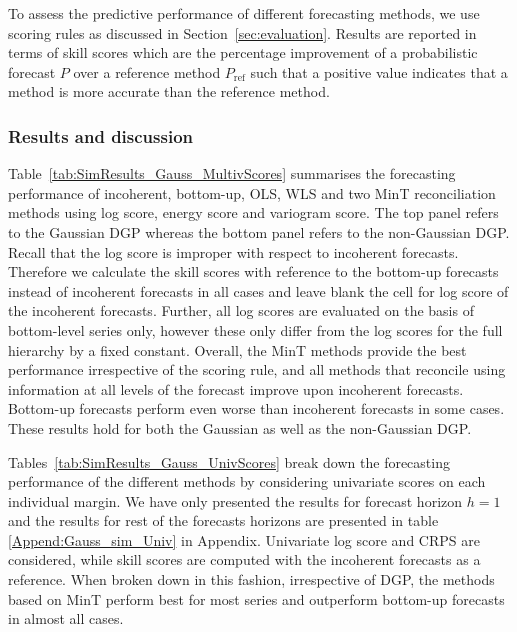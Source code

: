 \documentclass[12pt]{article}
\theoremstyle{definition}
\begin{document}
To assess the predictive performance of different forecasting methods, we use scoring rules as discussed in Section~\ref{sec:evaluation}. Results are reported in terms of skill scores which are the percentage improvement of a probabilistic forecast $P$ over a reference method $P_{\mbox{ref}}$ such that a positive value indicates that a method is more accurate than the reference method.

\subsubsection{Results and discussion}

Table~\ref{tab:SimResults_Gauss_MultivScores} summarises the forecasting performance of incoherent, bottom-up, OLS, WLS and two MinT reconciliation methods using log score, energy score and variogram score. The top panel refers to the Gaussian DGP whereas the bottom panel refers to the non-Gaussian DGP. Recall that the log score is improper with respect to incoherent forecasts. Therefore we calculate the skill scores with reference to the bottom-up forecasts instead of incoherent forecasts in all cases and leave blank the cell for log score of the incoherent forecasts. Further, all log scores are evaluated on the basis of bottom-level series only, however these only differ from the log scores for the full hierarchy by a fixed constant. Overall, the MinT methods provide the best performance irrespective of the scoring rule, and all methods that reconcile using information at all levels of the forecast improve upon incoherent forecasts. Bottom-up forecasts perform even worse than incoherent forecasts in some cases. These results hold for both the Gaussian as well as the non-Gaussian DGP.

Tables~\ref{tab:SimResults_Gauss_UnivScores} break down the forecasting performance of the different methods by considering univariate scores on each individual margin. We have only presented the results for forecast horizon $h=1$ and the results for rest of the forecasts horizons are presented in table \ref{Append:Gauss_sim_Univ} in Appendix.  Univariate log score and CRPS are considered, while skill scores are computed with the incoherent forecasts as a reference. When broken down in this fashion, irrespective of DGP, the methods based on MinT perform best for most series and outperform bottom-up forecasts in almost all cases.
\end{document}
